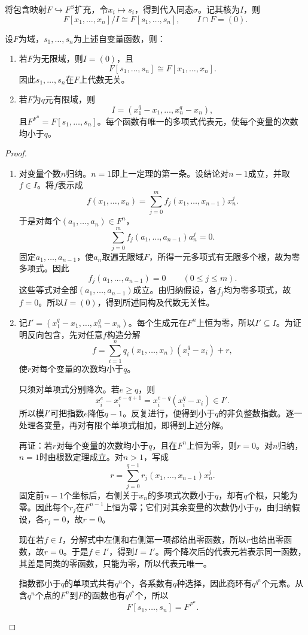 将包含映射$F\hookrightarrow F^S$扩充，令$x_i\mapsto s_i$，得到代入同态$\sigma$。记其核为$I$，则
\[
F[x_1,\ldots,x_n]/I\cong F[s_1,\ldots,s_n],\qquad I\cap F=(0).
\]

\begin{theorem}\label{p2:poly-functions-many}
设$F$为域，$s_1,\ldots,s_n$为上述自变量函数，则：
\begin{enumerate}
\item 若$F$为无限域，则$I=(0)$，且
\[
F[s_1,\ldots,s_n]\cong F[x_1,\ldots,x_n].
\]
因此$s_1,\ldots,s_n$在$F$上代数无关。
\item 若$F$为$q$元有限域，则
\[
I=(x_1^q-x_1,\ldots,x_n^q-x_n),
\]
且$F^{F^n}=F[s_1,\ldots,s_n]$。每个函数有唯一的多项式代表元，使每个变量的次数均小于$q$。
\end{enumerate}
\end{theorem}
\begin{proof}
\begin{enumerate}
\item 对变量个数$n$归纳。$n=1$即上一定理的第一条。设结论对$n-1$成立，并取$f\in I$。将$f$表示成
\[
f(x_1,\ldots,x_n)=\sum_{j=0}^m f_j(x_1,\ldots,x_{n-1})x_n^j.
\]
于是对每个$(a_1,\ldots,a_n)\in F^n$，
\[
\sum_{j=0}^m f_j(a_1,\ldots,a_{n-1})a_n^j=0.
\]
固定$a_1,\ldots,a_{n-1}$，使$a_n$取遍无限域$F$，所得一元多项式有无限多个根，故为零多项式。因此
\[
f_j(a_1,\ldots,a_{n-1})=0\qquad(0\le j\le m).
\]
这些等式对全部$(a_1,\ldots,a_{n-1})$成立。由归纳假设，各$f_j$均为零多项式，故$f=0$。所以$I=(0)$，得到所述同构及代数无关性。

\item 记$I'=(x_1^q-x_1,\ldots,x_n^q-x_n)$。每个生成元在$F^n$上恒为零，所以$I'\subseteq I$。为证明反向包含，先对任意$f$构造分解
\[
f=\sum_{i=1}^n q_i(x_1,\ldots,x_n)(x_i^q-x_i)+r,
\]
使$r$对每个变量的次数均小于$q$。

只须对单项式分别降次。若$e\ge q$，则
\[
x_i^e-x_i^{e-q+1}=x_i^{e-q}(x_i^q-x_i)\in I'.
\]
所以模$I'$可把指数$e$降低$q-1$。反复进行，便得到小于$q$的非负整数指数。逐一处理各变量，再对有限个单项式相加，即得到上述分解。

再证：若$r$对每个变量的次数均小于$q$，且在$F^n$上恒为零，则$r=0$。对$n$归纳，$n=1$时由根数定理成立。对$n>1$，写成
\[
r=\sum_{j=0}^{q-1}r_j(x_1,\ldots,x_{n-1})x_n^j.
\]
固定前$n-1$个坐标后，右侧关于$x_n$的多项式次数小于$q$，却有$q$个根，只能为零。因此每个$r_j$在$F^{n-1}$上恒为零；它们对其余变量的次数仍小于$q$，由归纳假设，各$r_j=0$，故$r=0$。

现在若$f\in I$，分解式中左侧和右侧第一项都给出零函数，所以$r$也给出零函数，故$r=0$。于是$f\in I'$，得到$I=I'$。两个降次后的代表元若表示同一函数，其差是同类的零函数，只能为零，所以代表元唯一。

指数都小于$q$的单项式共有$q^n$个，各系数有$q$种选择，因此商环有$q^{q^n}$个元素。从含$q^n$个点的$F^n$到$F$的函数也有$q^{q^n}$个，所以
\[
F[s_1,\ldots,s_n]=F^{F^n}.
\]
\end{enumerate}
\end{proof}
